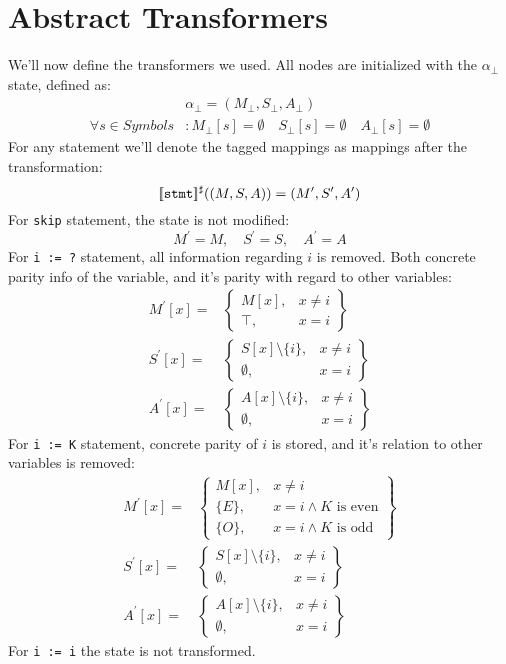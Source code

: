 \section*{Abstract Transformers}
We'll now define the transformers we used. All nodes are initialized with the $\alpha_\bot$ state, defined as:
\begin{align*}
	&\alpha_\bot=(M_\bot, S_\bot, A_\bot) \\
	\forall s \in Symbols&:
	M_\bot[s] =\emptyset  \quad
	S_\bot[s] =\emptyset \quad
	A_\bot[s] =\emptyset
\end{align*}
For any statement we'll denote the tagged mappings as mappings after the transformation:
\begin{equation*}
	[\![\texttt{stmt}]\!]^\sharp((M, S, A)) = (M^\prime,S^\prime,A^\prime)
\end{equation*}
For \texttt{skip} statement, the state is not modified:
\begin{equation*}
	M^\prime = M, \quad S^\prime = S, \quad A^\prime = A
\end{equation*}
For \texttt{i := ?} statement, all information regarding $i$ is removed. Both concrete parity info of the variable, and it's parity with regard to other variables:
\begin{align*}
M^\prime[x] = & \left.
	\begin{cases}
		M[x], & x\ne i \\
		\top, & x = i
	\end{cases}
\right\}\\
S^\prime[x] = & \left.
	\begin{cases}
		S[x] \setminus \{i\}, & x\ne i \\
		\emptyset, & x = i
	\end{cases}
\right\}\\
A^\prime[x] = & \left.
\begin{cases}
	A[x] \setminus \{i\}, & x\ne i \\
	\emptyset, & x = i
\end{cases}
\right\}
\end{align*}
For \texttt{i := K} statement, concrete parity of $i$ is stored, and it's relation to other variables is removed:
\begin{align*}
M^\prime[x] = & \left.
	\begin{cases}
		M[x], & x\ne i \\
		\{E\}, & x = i \wedge K \text{ is even} \\
		\{O\}, & x = i \wedge K \text{ is odd}
	\end{cases}
\right\}\\
S^\prime[x] = & \left.
	\begin{cases}
		S[x] \setminus \{i\}, & x\ne i \\
		\emptyset, & x = i
	\end{cases}
\right\}\\
A^\prime[x] = & \left.
\begin{cases}
	A[x] \setminus \{i\}, & x\ne i \\
	\emptyset, & x = i
\end{cases}
\right\}
\end{align*}
For \texttt{i := i} the state is not transformed.

